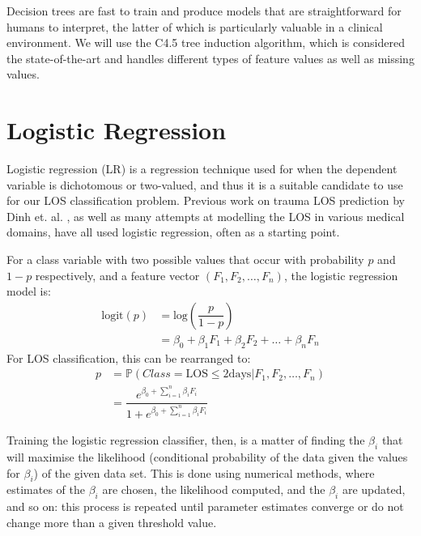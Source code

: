 Decision trees are fast to train and produce models that are straightforward
for humans to interpret, the latter of which is particularly valuable in a
clinical environment. We will use the C4.5 tree induction algorithm, which is
considered the state-of-the-art and handles different types of feature values
as well as missing values.

\section{Logistic Regression}
Logistic regression (LR) is a regression technique used for when the dependent
variable is dichotomous or two-valued, and thus it is a suitable candidate to
use for our LOS classification problem.
Previous work on trauma LOS prediction by
Dinh et. al. \cite{Dinh2013a}, as well as many attempts at modelling the LOS
in various medical domains, have all used logistic regression, often as a
starting point.

For a class variable with two possible values that occur with
probability $p$ and $1-p$ respectively, and a feature vector
$(F_1,F_2,\ldots,F_n)$, the logistic regression model is:
\begin{equation*}
\begin{aligned}
\mathrm{logit}(p) &= \mathrm{log} \left(\dfrac{p}{1-p}\right) \\
  &= \beta_0 + \beta_1F_1 + \beta_2F_2 + \ldots + \beta_nF_n
\end{aligned}
\end{equation*}
For LOS classification, this can be rearranged to:
\begin{equation*}
\begin{aligned}
p &= \mathbb{P}(Class=\mathrm{LOS }\leq2\mathrm{ days}|F_1,F_2,\ldots,F_n) \\
  &= \dfrac{e^{\beta_0 + \sum^n_{i=1}\beta_i F_i}}{1 + e^{\beta_0 + \sum^n_{i=1}\beta_i F_i}}
\end{aligned}
\end{equation*}

Training the logistic regression classifier, then, is a matter of finding the
$\beta_i$ that will maximise the likelihood (conditional probability of the
data given the values for $\beta_i$) of the given data set. This is done using
numerical methods, where estimates of the $\beta_i$ are chosen, the likelihood
computed, and the $\beta_i$ are updated, and so on: this process is repeated
until parameter estimates converge or do not change more than a given threshold
value.

